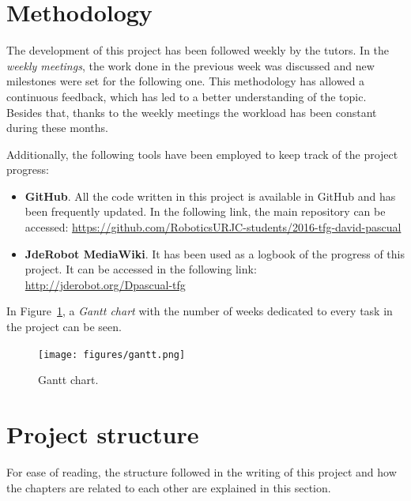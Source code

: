 \section{Methodology}
The development of this project has been followed weekly by the tutors. In the \emph{weekly meetings}, the work done in the previous week was discussed and new milestones were set for the following one. This methodology has allowed a continuous feedback, which has led to a better understanding of the topic. Besides that, thanks to the weekly meetings the workload has been constant during these months. 

Additionally, the following tools have been employed to keep track of the project progress:
\begin{itemize}
	\item \textbf{GitHub}. All the code written in this project is available in GitHub and has been  frequently updated. In the following link, the main repository can be accessed:
	\url{https://github.com/RoboticsURJC-students/2016-tfg-david-pascual}
	\item \textbf{JdeRobot MediaWiki}. It has been used as a logbook of the progress of this project. It can be accessed in the following link:
	\url{http://jderobot.org/Dpascual-tfg}
\end{itemize}

In Figure~\ref{fig:gantt}, a \emph{Gantt chart} with the number of weeks dedicated to every task in the project can be seen.
\begin{figure}
	\centering
	\texttt{[image: figures/gantt.png]}
	\caption{Gantt chart.}
	\label{fig:gantt}
\end{figure}

\section{Project structure}
For ease of reading, the structure followed in the writing of this project and how the chapters are related to each other are explained in this section.

